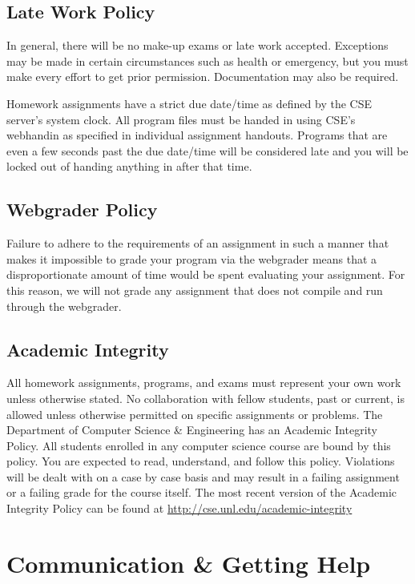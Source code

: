 \documentclass[12pt]{scrartcl}
\begin{document}
\subsection{Late Work Policy}

In general, there will be no make-up exams or late work
accepted.  Exceptions may be made in certain circumstances 
such as health or emergency, but you must make every effort 
to get prior permission.  Documentation may also be required.

Homework assignments have a strict due date/time as defined by
the CSE server's system clock.  All program files must be handed
in using CSE's webhandin as specified in individual assignment
handouts.  Programs that are even a few seconds past the due 
date/time will be considered late and you will be locked out
of handing anything in after that time.  

\subsection{Webgrader Policy}

Failure to adhere to the requirements of an assignment in such 
a manner that makes it impossible to grade your program via 
the webgrader means that a disproportionate amount of time 
would be spent evaluating your assignment.  For this reason, 
we will not grade any assignment that does not compile and 
run through the webgrader.  

\subsection{Academic Integrity}

All homework assignments, programs, and exams must represent
your own work unless otherwise stated.  No collaboration with 
fellow students, past or current, is allowed unless otherwise 
permitted on specific assignments or problems.  The Department of
Computer Science \& Engineering has an Academic Integrity Policy.  
All students enrolled in any computer science course are bound 
by this policy.  You are expected to read, understand, and follow 
this policy.  Violations will be dealt with on a case by case 
basis and may result in a failing assignment or a failing grade 
for the course itself.  The most recent version of the Academic 
Integrity Policy can be found at \url{http://cse.unl.edu/academic-integrity}

\section{Communication \& Getting Help}
\end{document}
